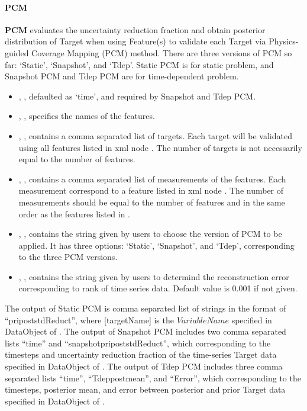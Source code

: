 \paragraph{PCM}
\textbf{PCM} evaluates the uncertainty reduction fraction and obtain posterior distribution of Target 
when using Feature(s) to validate each Target via Physics-guided Coverage Mapping (PCM) method. There are 
three versions of PCM so far: `Static', `Snapshot', and `Tdep'. Static PCM is for static problem, and Snapshot PCM 
and Tdep PCM are for time-dependent problem.
%
%

\begin{itemize}
  \item {}, , defaulted as `time', and required by Snapshot and Tdep PCM.
  \item {}, , specifies the names of the features. 
  \item {}, , contains a comma separated list of
     targets. \nb Each target will be validated using all features listed in xml node . The
    number of targets is not necessarily equal to the number of features. 
  \item {}, , contains a comma separated list of
     measurements of the features. \nb Each measurement correspond to a feature listed in xml node . The
    number of measurements should be equal to the number of features and in the same order as the features listed in .
  \item {}, , contains the string given by users to choose the version 
    of PCM to be applied. \nb It has three options: `Static', `Snapshot', and `Tdep', corresponding to the three PCM versions.
  \item {}, , contains the string given by users to determind the 
    reconstruction error corresponding to rank of time series data. Default value is 0.001 if not given.

\end{itemize}

The output of Static PCM is comma separated list of strings in the format of ``pri\textunderscore post\textunderscore stdReduct\textunderscore [targetName]'', 
where [targetName] is the $VariableName$ specified in DataObject of . 
The output of Snapshot PCM includes two comma separated lists ``time'' and  ``snapshot\textunderscore pri\textunderscore post\textunderscore stdReduct'', 
which corresponding to the timesteps and uncertainty reduction fraction of the time-series Target data specified in DataObject of .
The output of Tdep PCM includes three comma separated lists ``time'', ``Tdep\textunderscore post\textunderscore mean'', and ``Error'', 
which corresponding to the timesteps, posterior mean, and error between posterior and prior Target data specified in DataObject of .


